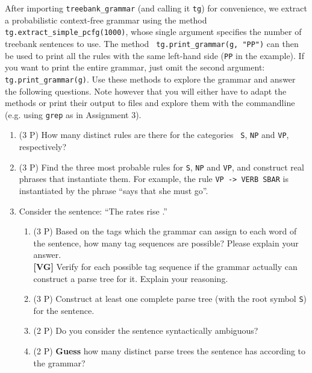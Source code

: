 \documentclass[10.9pt]{article}
\begin{document}
\begin{center}
\fbox{

}
\end{center}
After importing {\tt treebank\_grammar} (and calling it {\tt tg}) for
convenience, we extract a probabilistic context-free grammar using the
method {\tt tg.extract\_simple\_pcfg(1000)}, whose single argument
specifies the number of treebank sentences to use. The method {\tt
  tg.print\_grammar(g, "PP")} can then be used to print all the rules
with the same left-hand side ({\tt PP} in the example). If you want to
print the entire grammar, just omit the second argument: {\tt
  tg.print\_grammar(g)}. Use these methods to explore the grammar and
answer the following questions. Note however that you will either have
to adapt the methods or print their output to files and explore them
with the commandline (e.g. using {\tt grep} as in Assignment 3).
\begin{enumerate}[topsep=0.2cm,itemsep=0cm]
\item (3 P) How many distinct rules are there for the categories {\tt
    S}, {\tt NP} and {\tt VP}, respectively?
\item (3 P) Find the three most probable rules for {\tt S}, {\tt NP}
  and {\tt VP}, and construct real phrases that instantiate them.  For
  example, the rule {\tt VP -> VERB SBAR} is instantiated by the
  phrase ``says that she must go''.
\item Consider the sentence: ``The rates rise .''
  \begin{enumerate}[noitemsep,topsep=0cm]
  \item (3 P) Based on the tags which the grammar can assign to each
    word of the sentence, how many tag sequences are possible? Please
    explain your answer.\\
    \textbf{[VG]} Verify for each possible tag sequence if the grammar
    actually can construct a parse tree for it. Explain your reasoning.
\item (3 P) Construct at least one complete parse tree (with the root
  symbol {\tt S}) for the sentence.
\item (2 P) Do you consider the sentence syntactically ambiguous?
\item (2 P) \textbf{Guess} how many distinct parse trees the sentence
  has according to the grammar?
\end{enumerate}
\end{enumerate}
\end{document}

